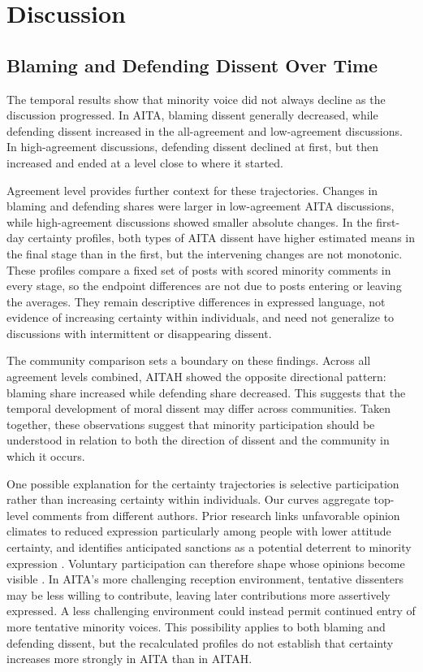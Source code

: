 \section{Discussion}
\label{sec:discussion}

\subsection{Blaming and Defending Dissent Over Time}
\label{subsec:discussion-temporal-dissent}
The temporal results show that minority voice did not always decline as the discussion progressed. In AITA, blaming dissent generally decreased, while defending dissent increased in the all-agreement and low-agreement discussions. In high-agreement discussions, defending dissent declined at first, but then increased and ended at a level close to where it started.

Agreement level provides further context for these trajectories. Changes in blaming and defending shares were larger in low-agreement AITA discussions, while high-agreement discussions showed smaller absolute changes. In the first-day certainty profiles, both types of AITA dissent have higher estimated means in the final stage than in the first, but the intervening changes are not monotonic. These profiles compare a fixed set of posts with scored minority comments in every stage, so the endpoint differences are not due to posts entering or leaving the averages. They remain descriptive differences in expressed language, not evidence of increasing certainty within individuals, and need not generalize to discussions with intermittent or disappearing dissent.

The community comparison sets a boundary on these findings. Across all agreement levels combined, AITAH showed the opposite directional pattern: blaming share increased while defending share decreased. This suggests that the temporal development of moral dissent may differ across communities. Taken together, these observations suggest that minority participation should be understood in relation to both the direction of dissent and the community in which it occurs.

One possible explanation for the certainty trajectories is selective participation rather than increasing certainty within individuals. Our curves aggregate top-level comments from different authors. Prior research links unfavorable opinion climates to reduced expression particularly among people with lower attitude certainty, and identifies anticipated sanctions as a potential deterrent to minority expression \cite{matthes2010spiral,neubaum2018sanctions}. Voluntary participation can therefore shape whose opinions become visible \cite{settle2025promise}. In AITA's more challenging reception environment, tentative dissenters may be less willing to contribute, leaving later contributions more assertively expressed. A less challenging environment could instead permit continued entry of more tentative minority voices. This possibility applies to both blaming and defending dissent, but the recalculated profiles do not establish that certainty increases more strongly in AITA than in AITAH.


